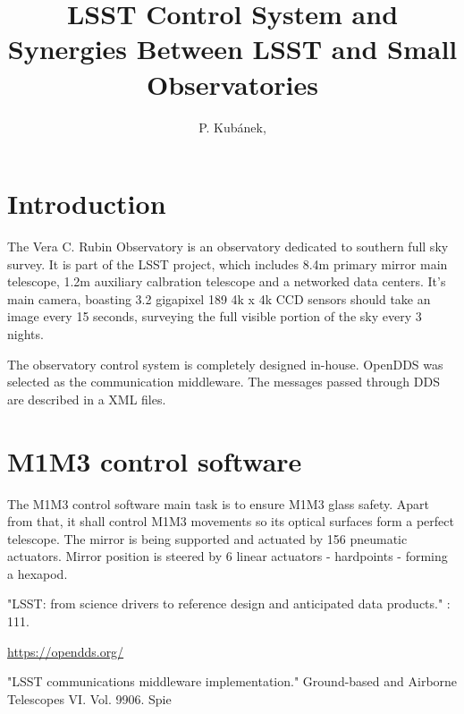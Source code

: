 \documentclass[proceedings, preprint]{rmaa}
\title{LSST Control System and Synergies Between LSST and Small Observatories}
\author{
  P. Kub\'anek,\altaffilmark{1} 
}
\begin{document}
\maketitle


\section{Introduction}
\label{sec:intro}

The Vera C. Rubin Observatory is an observatory dedicated to southern full sky
survey. It is part of the LSST\cite{2019lsst} project, which includes 8.4m
primary mirror main telescope, 1.2m auxiliary calbration telescope and a
networked data centers. It's main camera, boasting 3.2 gigapixel 189 4k x 4k
CCD sensors should take an image every 15 seconds, surveying the full visible
portion of the sky every 3 nights.

The observatory control system is completely designed in-house.
OpenDDS\cite{opendds} was selected as the communication middleware. The
messages passed through DDS are described in a XML files\cite{salxml}.

\section{M1M3 control software}

The M1M3 control software main task is to ensure M1M3 glass safety. Apart from
that, it shall control M1M3 movements so its optical surfaces form a perfect
telescope. The mirror is being supported and actuated by 156 pneumatic
actuators. Mirror position is steered by 6 linear actuators - hardpoints -
forming a hexapod.

\begin{thebibliography}
   "LSST: from science drivers to reference design and anticipated data products." : 111.

  \url{https://opendds.org/}

  "LSST communications middleware implementation." Ground-based and Airborne Telescopes VI. Vol. 9906. Spie

\end{thebibliography}
\end{document}
